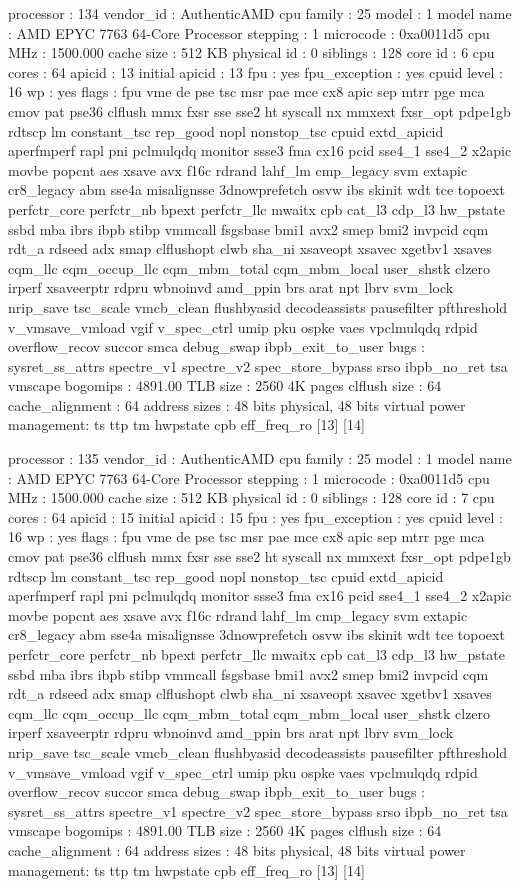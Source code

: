 processor	: 134
vendor_id	: AuthenticAMD
cpu family	: 25
model		: 1
model name	: AMD EPYC 7763 64-Core Processor
stepping	: 1
microcode	: 0xa0011d5
cpu MHz		: 1500.000
cache size	: 512 KB
physical id	: 0
siblings	: 128
core id		: 6
cpu cores	: 64
apicid		: 13
initial apicid	: 13
fpu		: yes
fpu_exception	: yes
cpuid level	: 16
wp		: yes
flags		: fpu vme de pse tsc msr pae mce cx8 apic sep mtrr pge mca cmov pat pse36 clflush mmx fxsr sse sse2 ht syscall nx mmxext fxsr_opt pdpe1gb rdtscp lm constant_tsc rep_good nopl nonstop_tsc cpuid extd_apicid aperfmperf rapl pni pclmulqdq monitor ssse3 fma cx16 pcid sse4_1 sse4_2 x2apic movbe popcnt aes xsave avx f16c rdrand lahf_lm cmp_legacy svm extapic cr8_legacy abm sse4a misalignsse 3dnowprefetch osvw ibs skinit wdt tce topoext perfctr_core perfctr_nb bpext perfctr_llc mwaitx cpb cat_l3 cdp_l3 hw_pstate ssbd mba ibrs ibpb stibp vmmcall fsgsbase bmi1 avx2 smep bmi2 invpcid cqm rdt_a rdseed adx smap clflushopt clwb sha_ni xsaveopt xsavec xgetbv1 xsaves cqm_llc cqm_occup_llc cqm_mbm_total cqm_mbm_local user_shstk clzero irperf xsaveerptr rdpru wbnoinvd amd_ppin brs arat npt lbrv svm_lock nrip_save tsc_scale vmcb_clean flushbyasid decodeassists pausefilter pfthreshold v_vmsave_vmload vgif v_spec_ctrl umip pku ospke vaes vpclmulqdq rdpid overflow_recov succor smca debug_swap ibpb_exit_to_user
bugs		: sysret_ss_attrs spectre_v1 spectre_v2 spec_store_bypass srso ibpb_no_ret tsa vmscape
bogomips	: 4891.00
TLB size	: 2560 4K pages
clflush size	: 64
cache_alignment	: 64
address sizes	: 48 bits physical, 48 bits virtual
power management: ts ttp tm hwpstate cpb eff_freq_ro [13] [14]

processor	: 135
vendor_id	: AuthenticAMD
cpu family	: 25
model		: 1
model name	: AMD EPYC 7763 64-Core Processor
stepping	: 1
microcode	: 0xa0011d5
cpu MHz		: 1500.000
cache size	: 512 KB
physical id	: 0
siblings	: 128
core id		: 7
cpu cores	: 64
apicid		: 15
initial apicid	: 15
fpu		: yes
fpu_exception	: yes
cpuid level	: 16
wp		: yes
flags		: fpu vme de pse tsc msr pae mce cx8 apic sep mtrr pge mca cmov pat pse36 clflush mmx fxsr sse sse2 ht syscall nx mmxext fxsr_opt pdpe1gb rdtscp lm constant_tsc rep_good nopl nonstop_tsc cpuid extd_apicid aperfmperf rapl pni pclmulqdq monitor ssse3 fma cx16 pcid sse4_1 sse4_2 x2apic movbe popcnt aes xsave avx f16c rdrand lahf_lm cmp_legacy svm extapic cr8_legacy abm sse4a misalignsse 3dnowprefetch osvw ibs skinit wdt tce topoext perfctr_core perfctr_nb bpext perfctr_llc mwaitx cpb cat_l3 cdp_l3 hw_pstate ssbd mba ibrs ibpb stibp vmmcall fsgsbase bmi1 avx2 smep bmi2 invpcid cqm rdt_a rdseed adx smap clflushopt clwb sha_ni xsaveopt xsavec xgetbv1 xsaves cqm_llc cqm_occup_llc cqm_mbm_total cqm_mbm_local user_shstk clzero irperf xsaveerptr rdpru wbnoinvd amd_ppin brs arat npt lbrv svm_lock nrip_save tsc_scale vmcb_clean flushbyasid decodeassists pausefilter pfthreshold v_vmsave_vmload vgif v_spec_ctrl umip pku ospke vaes vpclmulqdq rdpid overflow_recov succor smca debug_swap ibpb_exit_to_user
bugs		: sysret_ss_attrs spectre_v1 spectre_v2 spec_store_bypass srso ibpb_no_ret tsa vmscape
bogomips	: 4891.00
TLB size	: 2560 4K pages
clflush size	: 64
cache_alignment	: 64
address sizes	: 48 bits physical, 48 bits virtual
power management: ts ttp tm hwpstate cpb eff_freq_ro [13] [14]

